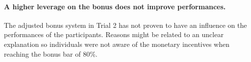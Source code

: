 \paragraph{A higher leverage on the bonus does not improve performances.}
The adjusted bonus system in Trial 2 has not proven to have an influence on the performances of the participants. Reasons might be related to an unclear explanation so individuals were not aware of the monetary incentives when reaching the bonus bar of 80\%.
%
%
%
%
%
%
%
%
